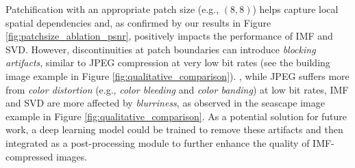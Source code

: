 Patchification with an appropriate patch size (e.g., $(8, 8)$) helps capture local spatial dependencies and, as confirmed by our results in Figure \ref{fig:patchsize_ablation_psnr}, positively impacts the performance of IMF and SVD. However, discontinuities at patch boundaries can introduce \emph{blocking artifacts}, similar to JPEG compression at very low bit rates (see the building image example in Figure \ref{fig:qualitative_comparison}). , while JPEG suffers more from \emph{color distortion} (e.g., \emph{color bleeding} and \emph{color banding}) at low bit rates, IMF and SVD are more affected by \emph{blurriness}, as observed in the seascape image example in Figure \ref{fig:qualitative_comparison}. As a potential solution for future work, a deep learning model could be trained to remove these artifacts and then integrated as a post-processing module to further enhance the quality of IMF-compressed images.

